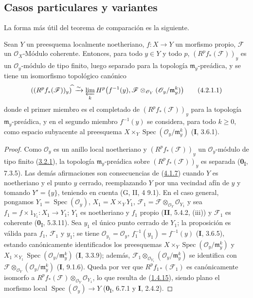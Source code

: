 \subsection{Casos particulares y variantes}
\label{subsection:III.4.2}
\label{subsection:III.4.2-fr}

La forma más útil del teorema de comparación  es la
siguiente.

\begin{proposition}[4.2.1]
\label{III.4.2.1-fr}
Sean $Y$ un preesquema localmente noetheriano, $f:X\to Y$ un morfismo
propio, $\mathcal F$ un $\mathcal O_X$-Módulo coherente. Entonces, para todo
$y\in Y$ y todo $p$, $(R^pf_*(\mathcal F))_y$ es
un $\mathcal O_y$-módulo de tipo finito, luego separado para la topología
$\mathfrak m_y$-preádica, y se tiene un isomorfismo topológico canónico
\[
((R^pf_*(\mathcal F))_y)^{\widehat{\,}}
\xrightarrow{\sim}
\varprojlim_kH^p\bigl(f^{-1}(y),
\mathcal F\otimes_{\mathcal O_Y}(\mathcal O_y/\mathfrak m_y^k)\bigr)
\tag{4.2.1.1}\label{III.4.2.1.1-fr}
\]
donde el primer miembro es el completado de $(R^pf_*(\mathcal F))_y$ para la
topología $\mathfrak m_y$-preádica, y en el segundo miembro $f^{-1}(y)$ se
considera, para todo $k\geq0$, como espacio subyacente al preesquema
$X\times_Y\operatorname{Spec}(\mathcal O_y/\mathfrak m_y^k)$
\textup{(\textbf{I}, 3.6.1)}.
\end{proposition}

\begin{proof}
Como $\mathcal O_y$ es un anillo local noetheriano y
$(R^pf_*(\mathcal F))_y$ un $\mathcal O_y$-módulo de tipo finito
(\hyperref[III.3.2.1-fr]{3.2.1}), la topología $\mathfrak m_y$-preádica
sobre $(R^pf_*(\mathcal F))_y$ es separada (\textbf{0}\textsubscript{I}, 7.3.5). Las
demás afirmaciones son consecuencias de (\hyperref[III.4.1.7-fr]{4.1.7})
cuando $Y$ es noetheriano y el punto $y$ cerrado, reemplazando $Y$ por una
vecindad afín de $y$ y tomando $Y'=\{y\}$, teniendo en cuenta
(G, II, 4 9.1). En el caso general, pongamos
$Y_1=\operatorname{Spec}(\mathcal O_y)$, $X_1=X\times_YY_1$,
$\mathcal F_1=\mathcal F\otimes_{\mathcal O_Y}\mathcal O_{Y_1}$
y sea $f_1=f\times1_{Y_1}:X_1\to Y_1$; $Y_1$ es noetheriano y $f_1$
propio (\textbf{II}, 5.4.2, (iii)) y $\mathcal F_1$ es coherente
(\textbf{0}\textsubscript{I}, 5.3.11). Sea $y_1$ el único punto cerrado de $Y_1$;
la proposición es válida para $f_1$, $\mathcal F_1$ y $y_1$; se tiene
$\mathcal O_{y_1}=\mathcal O_y$, $f_1^{-1}(y_1)=f^{-1}(y)$ (\textbf{I}, 3.6.5),
estando canónicamente identificados los preesquemas
$X\times_Y\operatorname{Spec}(\mathcal O_y/\mathfrak m_y^k)$ y
$X_1\times_{Y_1}\operatorname{Spec}(\mathcal O_y/\mathfrak m_y^k)$
(\textbf{I}, 3.3.9); además,
$\mathcal F_1\otimes_{\mathcal O_{Y_1}}
(\mathcal O_y/\mathfrak m_y^k)$ se identifica con
$\mathcal F\otimes_{\mathcal O_Y}(\mathcal O_y/\mathfrak m_y^k)$
(\textbf{I}, 9.1.6). Queda por ver que $R^pf_{1*}(\mathcal F_1)$ es
canónicamente isomorfo a
$R^pf_*(\mathcal F)\otimes_{\mathcal O_Y}\mathcal O_{Y_1}$, lo que
resulta de (\hyperref[III.1.4.15-fr]{1.4.15}), siendo plano el morfismo local
$\operatorname{Spec}(\mathcal O_y)\to Y$
(\textbf{0}\textsubscript{I}, 6.7.1 y \textbf{I}, 2.4.2).
\end{proof}

